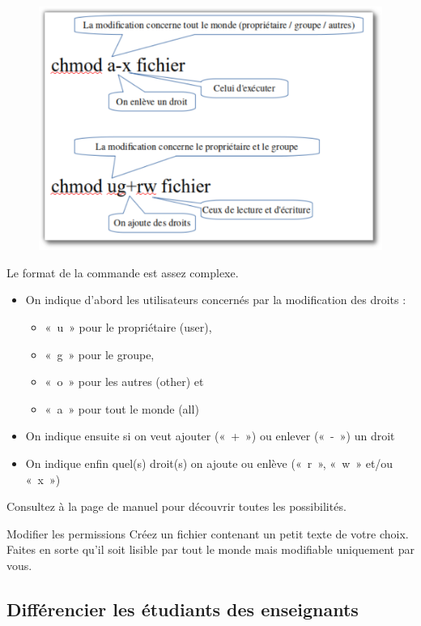 \documentclass[a4paper,11pt]{style-esi/td}
\begin{document}
			\begin{figure}
				\vspace{-1em}
				\includegraphics[width=.4\textwidth]{image/chmod.pdf}
				\vspace{-2em}
			\end{figure}
			Le format de la commande est assez complexe. 
			\begin{itemize}
			\item
				On indique d'abord les utilisateurs concernés par la modification des droits :
				\begin{itemize}
				\item « u » pour le propriétaire (user), 
				\item « g » pour le groupe, 
				\item « o » pour les autres (other) et
				\item « a » pour tout le monde (all)
				\end{itemize}  
			\item
				On indique ensuite si on veut ajouter (« + ») 
				ou enlever (« - ») un droit
			\item 
				On indique enfin quel(s) droit(s) on ajoute ou enlève 
				(« r », « w » et/ou « x »)
			\end{itemize}

			Consultez à la page de manuel pour découvrir toutes les possibilités.

			\begin{Exercice}{Modifier les permissions}
				Créez un fichier  
				contenant un petit texte de votre choix.
				Faites en sorte qu'il soit lisible par tout le monde
				mais modifiable uniquement par vous.
			\end{Exercice}

	\subsection{Différencier les étudiants des enseignants}
\end{document}
